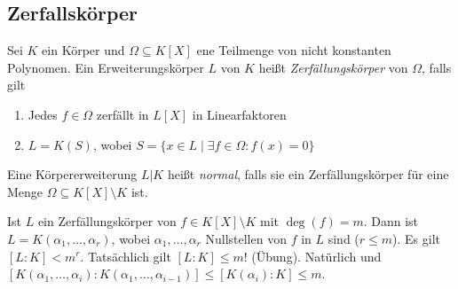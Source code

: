 \documentclass[../main.tex]{subfiles}
\begin{document}
\subsection{Zerfallskörper}

\begin{definition}
    Sei $K$ ein Körper und $\Omega \subseteq K[X]$ ene Teilmenge von nicht konstanten Polynomen. Ein Erweiterungskörper $L$ von $K$ heißt \emph{Zerfällungskörper} von $\Omega$, falls gilt
    \begin{enumerate}
        \item Jedes $f\in \Omega$ zerfällt in $L[X]$ in Linearfaktoren
        \item $L=K(S)$, wobei $S=\{x\in L \mid \exists f\in \Omega: f(x)=0\}$
    \end{enumerate}
    Eine Körpererweiterung $L|K$ heißt \emph{normal}, falls sie ein Zerfällungskörper für eine Menge $\Omega \subseteq K[X]\setminus K$ ist.
\end{definition}

\begin{remark}
    Ist $L$ ein Zerfällungskörper von $f\in K[X]\setminus K$ mit $\deg(f)=m$.
    Dann ist $L=K(\alpha_1, \dots, \alpha_r)$, wobei $\alpha_1,\dots,\alpha_r$ Nullstellen von $f$ in $L$ sind ($r\leq m$).
    Es gilt $[L:K]< m^r$.
    Tatsächlich gilt $[L:K] \leq m!$ (Übung).
    Natürlich \TODO[graphik] und $[K(\alpha_1,\dots,\alpha_i):K(\alpha_1,\dots,\alpha_{i-1})] \leq [K(\alpha_i):K] \leq m$.
\end{remark}
\end{document}
